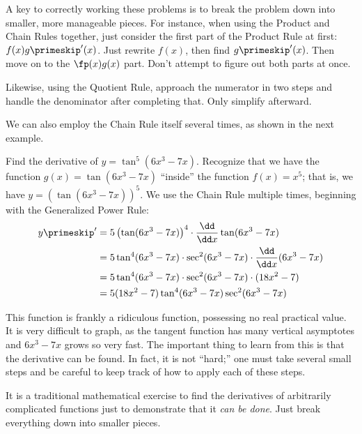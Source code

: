 A key to correctly working these problems is to break the problem down into smaller, more manageable pieces. For instance, when using the Product and Chain Rules together, just consider the first part of the Product Rule at first: $f(x)g\primeskip'(x)$. Just rewrite $f(x)$, then find $g\primeskip'(x)$. Then move on to the $\fp(x)g(x)$ part. Don't attempt to figure out both parts at once.

Likewise, using the Quotient Rule, approach the numerator in two steps and handle the denominator after completing that. Only simplify afterward.

We can also employ the Chain Rule itself several times, as shown in the next example.

\begin{example}\label{ex_chain6}
Find the derivative of $y = \tan^5(6x^3-7x)$.
\solution
Recognize that we have the function $g(x)=\tan(6x^3-7x)$ ``inside'' the function $f(x) = x^5$; that is, we have $y=\left(\tan(6x^3-7x)\right)^5$. We use the Chain Rule multiple times, beginning with the Generalized Power Rule:
\begin{align*}
y\primeskip' &= 5\left(\tan(6x^3-7x)\right)^4 \cdot \frac{\dd}{\dd x} \tan(6x^3-7x)\\
&= 5\tan^4(6x^3-7x) \cdot \sec^2 (6x^3-7x) \cdot \frac{\dd}{\dd x}(6x^3-7x) \\
&= 5\tan^4 (6x^3-7x) \cdot \sec^2 (6x^3-7x) \cdot (18x^2-7)\\
&= 5(18x^2-7)\tan^4 (6x^3-7x) \sec^2 (6x^3-7x) \\
\end{align*}

This function is frankly a ridiculous function, possessing no real practical value. It is very difficult to graph, as the tangent function has many vertical asymptotes and $6x^3-7x$ grows so very fast. The important thing to learn from this is that the derivative can be found. In fact, it is not ``hard;'' one must take several small steps and be careful to keep track of how to apply each of these steps.%
\end{example}

It is a traditional mathematical exercise to find the derivatives of arbitrarily complicated functions just to demonstrate that it \emph{can be done}. Just break everything down into smaller pieces.

